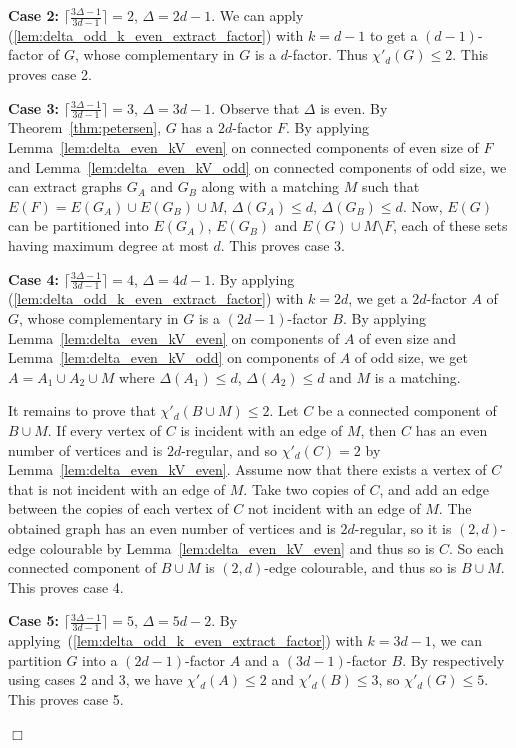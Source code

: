 \documentclass[11pt]{article}
\newcounter{claim}
\newenvironment{proof}[1][]%
 {\noindent {\setcounter{claim}{0}\sc proof ---
   }{#1}{}}{\hfill$\Box$\vspace{2ex}}
\begin{document}
\begin{proof}
\textbf{Case 2:}\label{case:delta_two_d_minus_one} 
$\lceil \frac{3\Delta - 1}{3d - 1} \rceil = 2$, $\Delta = 2d - 1$. 
We can apply (\ref{lem:delta_odd_k_even_extract_factor}) with $k = d - 1$ to get a $(d-1)$-factor of $G$, whose complementary in $G$ is a $d$-factor. Thus $\chi'_{d}(G) \leq 2$. This proves case 2. 
\smallskip

\textbf{Case 3:}\label{case:delta_three_d_minus_one} 
$\lceil \frac{3\Delta - 1}{3d - 1} \rceil = 3$, $\Delta = 3d - 1$. Observe that $\Delta$ is even. 
By Theorem~\ref{thm:petersen}, $G$ has a $2d$-factor $F$. 
By applying Lemma~\ref{lem:delta_even_kV_even} on connected components of even size of $F$ and Lemma~\ref{lem:delta_even_kV_odd} on connected components of odd size, we can extract  graphs $G_{A}$ and $G_{B}$ along with a matching $M$ such that $E(F) = E(G_A) \cup E(G_B) \cup M$, $\Delta(G_{A}) \leq d$, $\Delta(G_{B}) \leq d$. Now, $E(G)$ can be partitioned into $E(G_A)$, $E(G_B)$ and $E(G) \cup M \setminus F$, each of these sets  having maximum degree at most $d$. This proves case 3. 
\smallskip

\textbf{Case 4:} 
$\lceil \frac{3\Delta - 1}{3d - 1} \rceil = 4$, $\Delta = 4d - 1$. 
By applying (\ref{lem:delta_odd_k_even_extract_factor}) with $k = 2d$, we get a $2d$-factor $A$ of $G$, whose complementary in $G$ is a $(2d-1)$-factor $B$. By applying Lemma~\ref{lem:delta_even_kV_even} on components of $A$ of even size and Lemma~\ref{lem:delta_even_kV_odd} on components of $A$ of odd size, we get $A = A_{1} \cup A_{2} \cup M$ where $\Delta(A_{1}) \leq d$, $\Delta(A_{2}) \leq d$ and $M$ is a matching.

It remains to prove that $\chi'_{d}(B \cup M) \leq 2$. Let $C$ be a connected component of $B \cup M$. 
If every vertex of $C$ is incident with an edge of $M$, then $C$ has an even number of vertices and is $2d$-regular, and so $\chi'_d(C) = 2$ by Lemma~\ref{lem:delta_even_kV_even}. 
Assume now that there exists a vertex of $C$ that is not incident with an edge of $M$. Take two copies of $C$, and add an edge between the copies of each vertex of $C$ not incident with an edge of $M$. The obtained graph has an even number of vertices and is $2d$-regular, so it is $(2,d)$-edge colourable by Lemma~\ref{lem:delta_even_kV_even} and thus so is $C$. So each connected component of $B \cup M$ is $(2,d)$-edge colourable, and thus so is $B \cup M$. This proves case 4.
\smallskip

\textbf{Case 5:} 
$\lceil \frac{3\Delta - 1}{3d - 1} \rceil = 5$, $\Delta = 5d - 2$. 
By applying~(\ref{lem:delta_odd_k_even_extract_factor}) with $k = 3d - 1$, we can partition $G$ into a $(2d-1)$-factor $A$ and a $(3d-1)$-factor $B$. By respectively using cases 2 and 3, we have $\chi'_d(A) \leq 2$ and $\chi'_d(B)\leq 3$, so $\chi'_d(G) \leq 5$. This proves case 5. 
\medskip


\end{proof}
\end{document}

